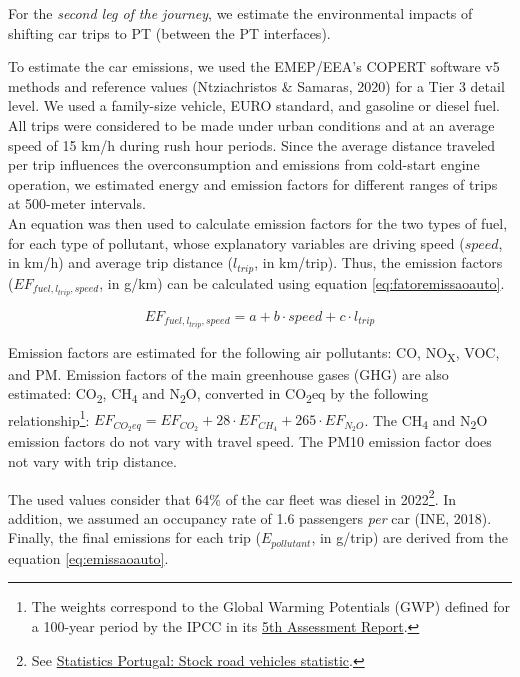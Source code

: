 \documentclass[review, doubleblind, 3p,
authoryear]{elsarticle} %
\begin{document}
For the \emph{second leg of the journey}, we estimate the environmental
impacts of shifting car trips to PT (between the PT interfaces).

To estimate the car emissions, we used the EMEP/EEA's COPERT software v5
methods and reference values (Ntziachristos \& Samaras, 2020) for a Tier
3 detail level. We used a family-size vehicle, EURO standard, and
gasoline or diesel fuel. All trips were considered to be made under
urban conditions and at an average speed of 15 km/h during rush hour
periods. Since the average distance traveled per trip influences the
overconsumption and emissions from cold-start engine operation, we
estimated energy and emission factors for different ranges of trips at
500-meter intervals.\\
An equation was then used to calculate emission factors for the two
types of fuel, for each type of pollutant, whose explanatory variables
are driving speed (\(speed\), in km/h) and average trip distance
(\(l_{trip}\), in km/trip). Thus, the emission factors
(\(EF_{fuel,l_{trip},speed}\), in g/km) can be calculated using equation
\ref{eq:fatoremissaoauto}.

\begin{equation}\label{eq:fatoremissaoauto}
{EF}_{fuel,l_{trip},speed} = a + b\cdot {speed} + c\cdot l_{trip}
\end{equation}

Emission factors are estimated for the following air pollutants: CO,
NO\textsubscript{X}, VOC, and PM. Emission factors of the main
greenhouse gases (GHG) are also estimated: CO\textsubscript{2},
CH\textsubscript{4} and N\textsubscript{2}O, converted in
CO\textsubscript{2}eq by the following relationship\footnote{The weights
  correspond to the Global Warming Potentials (GWP) defined for a
  100-year period by the IPCC in its
  \href{https://www.ipcc.ch/report/ar5/}{5th Assessment Report}.}:
\(EF_{CO_2eq} = EF_{CO_2} + 28\cdot EF_{CH_4} + 265\cdot EF_{N_2O}\).
The CH\textsubscript{4} and N\textsubscript{2}O emission factors do not
vary with travel speed. The PM10 emission factor does not vary with trip
distance.

The used values consider that 64\% of the car fleet was diesel in
2022\footnote{See
  \href{https://smi.ine.pt/Indicador/Detalhes/10837?LANG=EN}{Statistics
  Portugal: Stock road vehicles statistic}.}. In addition, we assumed an
occupancy rate of 1.6 passengers \emph{per} car (INE, 2018). Finally,
the final emissions for each trip (\(E_{pollutant}\), in g/trip) are
derived from the equation \ref{eq:emissaoauto}.
\end{document}
